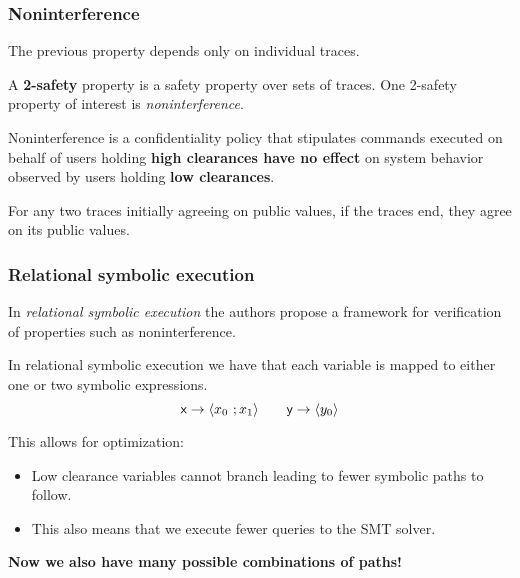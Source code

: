 \documentclass{beamer}
\begin{document}
\begin{frame}
  \frametitle{Noninterference}
  The previous property depends only on individual traces.

  \vspace{1em}
  A \textbf{2-safety} \citep{Clarkson2008} property is a safety property over sets of traces.
  One 2-safety property of interest is \emph{noninterference}.

  \pause
  \vspace{1em}
  Noninterference is a confidentiality policy that stipulates commands executed on behalf of
  users holding \textbf{high clearances have no effect} on system behavior observed by users holding
  \textbf{low clearances}.

  \pause
  \begin{center}
    For any two traces initially agreeing on public values, if the traces end, they agree on its
    public values.
  \end{center}
\end{frame}

\begin{frame}
  \frametitle{Relational symbolic execution}
  In \emph{relational symbolic execution} \citep*{DBLP:journals/corr/abs-1711-08349} the authors
  propose a framework for verification of properties such as noninterference.
  
  \pause
  \vspace{1em}
  In relational symbolic execution we have that each variable is mapped to either one or two
  symbolic expressions.
  \[
    \textsf{x} \rightarrow \langle x_0\ ; x_1 \rangle \qquad \textsf{y} \rightarrow \langle y_0 \rangle
  \]

  \pause
  This allows for optimization:
  \begin{itemize}
    \item Low clearance variables cannot branch leading to fewer symbolic paths to follow.
    \item This also means that we execute fewer queries to the SMT solver.
  \end{itemize}
  \centering
  \textbf{Now we also have many possible combinations of paths!}
\end{frame}
\end{document}
